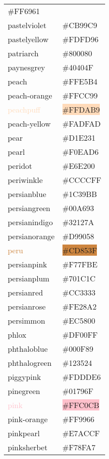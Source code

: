 \documentclass[
]{article}
\begin{document}
\begin{longtable}[]{@{}ll@{}}
\colorbox{pastelred}{\#FF6961}\tabularnewline
\textcolor{pastelviolet}{pastelviolet} &
\colorbox{pastelviolet}{\#CB99C9}\tabularnewline
\textcolor{pastelyellow}{pastelyellow} &
\colorbox{pastelyellow}{\#FDFD96}\tabularnewline
\textcolor{patriarch}{patriarch} &
\colorbox{patriarch}{\#800080}\tabularnewline
\textcolor{paynesgrey}{paynesgrey} &
\colorbox{paynesgrey}{\#40404F}\tabularnewline
\textcolor{peach}{peach} & \colorbox{peach}{\#FFE5B4}\tabularnewline
\textcolor{peach-orange}{peach-orange} &
\colorbox{peach-orange}{\#FFCC99}\tabularnewline
\textcolor{peachpuff}{peachpuff} &
\colorbox{peachpuff}{\#FFDAB9}\tabularnewline
\textcolor{peach-yellow}{peach-yellow} &
\colorbox{peach-yellow}{\#FADFAD}\tabularnewline
\textcolor{pear}{pear} & \colorbox{pear}{\#D1E231}\tabularnewline
\textcolor{pearl}{pearl} & \colorbox{eggshell}{\#F0EAD6}\tabularnewline
\textcolor{peridot}{peridot} &
\colorbox{peridot}{\#E6E200}\tabularnewline
\textcolor{periwinkle}{periwinkle} &
\colorbox{lavenderblue}{\#CCCCFF}\tabularnewline
\textcolor{persianblue}{persianblue} &
\colorbox{persianblue}{\#1C39BB}\tabularnewline
\textcolor{persiangreen}{persiangreen} &
\colorbox{persiangreen}{\#00A693}\tabularnewline
\textcolor{persianindigo}{persianindigo} &
\colorbox{persianindigo}{\#32127A}\tabularnewline
\textcolor{persianorange}{persianorange} &
\colorbox{persianorange}{\#D99058}\tabularnewline
\textcolor{peru}{peru} & \colorbox{peru}{\#CD853F}\tabularnewline
\textcolor{persianpink}{persianpink} &
\colorbox{persianpink}{\#F77FBE}\tabularnewline
\textcolor{persianplum}{persianplum} &
\colorbox{persianplum}{\#701C1C}\tabularnewline
\textcolor{persianred}{persianred} &
\colorbox{persianred}{\#CC3333}\tabularnewline
\textcolor{persianrose}{persianrose} &
\colorbox{persianrose}{\#FE28A2}\tabularnewline
\textcolor{persimmon}{persimmon} &
\colorbox{persimmon}{\#EC5800}\tabularnewline
\textcolor{phlox}{phlox} & \colorbox{phlox}{\#DF00FF}\tabularnewline
\textcolor{phthaloblue}{phthaloblue} &
\colorbox{phthaloblue}{\#000F89}\tabularnewline
\textcolor{phthalogreen}{phthalogreen} &
\colorbox{phthalogreen}{\#123524}\tabularnewline
\textcolor{piggypink}{piggypink} &
\colorbox{piggypink}{\#FDDDE6}\tabularnewline
\textcolor{pinegreen}{pinegreen} &
\colorbox{pinegreen}{\#01796F}\tabularnewline
\textcolor{pink}{pink} & \colorbox{pink}{\#FFC0CB}\tabularnewline
\textcolor{pink-orange}{pink-orange} &
\colorbox{atomictangerine}{\#FF9966}\tabularnewline
\textcolor{pinkpearl}{pinkpearl} &
\colorbox{pinkpearl}{\#E7ACCF}\tabularnewline
\textcolor{pinksherbet}{pinksherbet} &
\colorbox{pinksherbet}{\#F78FA7}\tabularnewline

\end{longtable}
\end{document}
